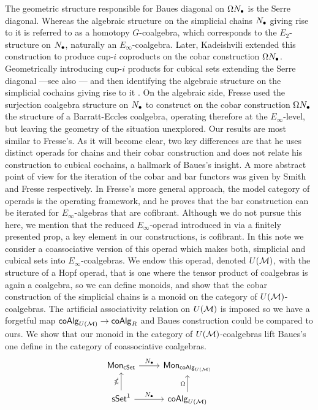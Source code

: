 The geometric structure responsible for Baues diagonal on $\Omega N_\bullet$ is the Serre diagonal.
Whereas the algebraic structure on the simplicial chains $N_\bullet$ giving rise to it is referred to as a homotopy $G$-coalgebra, which corresponds to the $E_2$-structure on $N_\bullet$, naturally an $E_\infty$-coalgebra.
Later, Kadeishvili extended this construction to produce cup-$i$ coproducts on the cobar construction $\Omega N_\bullet$.
Geometrically introducing cup-$i$ products for cubical sets extending the Serre diagonal \cite{Kadeishvili99coproducts} ---see also \cite{Pilarczyk2016cubical}--- and then identifying the algebraic structure on the simplicial cochains giving rise to it \cite{Kadeishvili03cup-i}.
On the algebraic side, Fresse \cite{Fresse03construction} used the surjection coalgebra structure on $N_\bullet$ to construct on the cobar construction $\Omega N_\bullet$ the  structure of a Barratt-Eccles coalgebra, operating therefore at the $E_\infty$-level, but leaving the geometry of the situation unexplored.
Our results are most similar to Fresse's.
As it will become clear, two key differences are that he uses distinct operads for chains and their cobar construction and does not relate his construction to cubical cochains, a hallmark of Baues's insight.
A more abstract point of view for the iteration of the cobar and bar functors was given by Smith \cite{Smith94cobar} and Fresse \cite{Fresse10complex} respectively. 
In Fresse's more general approach, the model category of operads is the operating framework, and he proves that the bar construction can be iterated for $E_\infty$-algebras that are cofibrant.
Although we do not pursue this here, we mention that the reduced $E_\infty$-operad introduced in \cite{Medina20prop1} via a finitely presented prop, a key element in our constructions, is cofibrant.
In this note we consider a coassociative version of this operad which makes both, simplicial and cubical sets into $E_\infty$-coalgebras.
We endow this operad, denoted $U(\mathcal{M})$, with the structure of a Hopf operad, that is one where the tensor product of coalgebras is again a coalgebra, so we can define monoids, and show that the cobar construction of the simplicial chains is a monoid on the category of $U(\mathcal{M})$-coalgebras.
The artificial associativity relation on $U(\mathcal{M})$ is imposed so we have a forgetful map $\mathsf{coAlg}_{U(\mathcal{M})} \to \mathsf{coAlg}_R$ and Baues construction could be compared to ours. We show that our monoid in the category of $U(\mathcal{M})$-coalgebras lift Baues's one define in the category of coassociative coalgebras.
\begin{equation*}
\begin{tikzcd}
\Mon_{\cSet} \arrow[r, "\chains"] & \Mon_{\coAlg_{U(\M)}} \\
\sSet^1 \arrow[r, "\chains"] \arrow[u, "\gcobar"] & \coAlg_{U(\M)} \arrow[u, "\cobar"]
\end{tikzcd}
\end{equation*}


